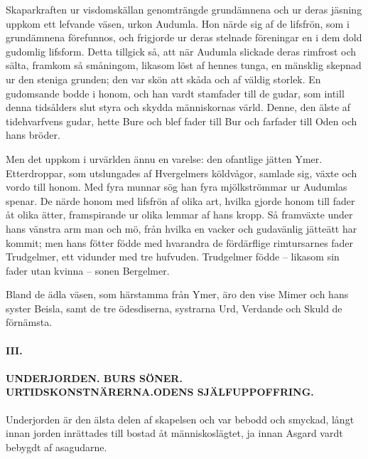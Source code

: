Skaparkraften ur visdomskällan genomträngde grundämnena och ur deras
jäsning uppkom ett lefvande väsen, urkon Audumla. Hon närde sig af de
lifsfrön, som i grundämnena förefunnos, och frigjorde ur deras stelnade
föreningar en i dem dold gudomlig lifsform. Detta tillgick så, att när
Audumla slickade deras rimfrost och sälta, framkom så småningom, likasom
löst af hennes tunga, en mänsklig skepnad ur den steniga grunden; den
var skön att skåda och af väldig storlek. En gudomsande bodde i honom,
och han vardt stamfader till de gudar, som intill denna tidsålders slut
styra och skydda människornas värld. Denne, den älste af tidehvarfvens
gudar, hette Bure och blef fader till Bur och farfader till Oden och
hans bröder.

Men det uppkom i urvärlden ännu en varelse: den ofantlige jätten Ymer.
Etterdroppar, som utslungades af Hvergelmers köldvågor, samlade sig,
växte och vordo till honom. Med fyra munnar sög han fyra mjölkströmmar
ur Audumlas spenar. De närde honom med lifsfrön af olika art, hvilka
gjorde honom till fader åt olika ätter, framspirande ur olika lemmar af
hans kropp. Så framväxte under hans vänstra arm man och mö, från hvilka
en vacker och gudavänlig jätteätt har kommit; men hans fötter födde med
hvarandra de
\protect\hypertarget{lb1625905.xhtmlux5cux23start5}{}{}\protect\hypertarget{lb1625905.xhtmlux5cux23start5-a}{}{}\protect\hypertarget{lb1625905.xhtmlux5cux23start5-b}{}{}\protect\hypertarget{lb1625905.xhtmlux5cux23start5-c}{}{}\protect\hypertarget{lb1625905.xhtmlux5cux23start5-d}{}{}
fördärflige rimtursarnes fader Trudgelmer, ett vidunder med tre
hufvuden. Trudgelmer födde -- likasom sin fader utan kvinna -- sonen
Bergelmer.

Bland de ädla väsen, som härstamma från Ymer, äro den vise Mimer och
hans syster Beisla, samt de tre ödesdiserna, systrarna Urd, Verdande och
Skuld de förnämsta.

\paragraph{III.}

\paragraph{UNDERJORDEN. BURS SÖNER. URTIDSKONSTNÄRERNA.ODENS
SJÄLFUPPOFFRING.}

Underjorden är den älsta delen af skapelsen och var bebodd och smyckad,
långt innan jorden inrättades till bostad åt människoslägtet, ja innan
Asgard vardt bebygdt af asagudarne.

